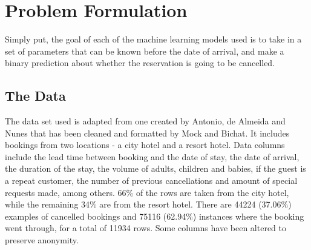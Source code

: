 \documentclass[10pt,conference]{IEEEtran}
\begin{document}
\section{Problem Formulation}
  Simply put, the goal of each of the machine learning models used is to take in a set of parameters that can be known before the date of arrival, and make a binary prediction about whether the reservation is going to be cancelled.
  \subsection{The Data}
    The data set used is adapted from one created by Antonio, de Almeida and Nunes\cite{Antonio2019} that has been cleaned and formatted by Mock and Bichat\cite{mock_bichat}. It includes bookings from two locations - a city hotel and a resort hotel. Data columns include the lead time between booking and the date of stay, the date of arrival, the duration of the stay, the volume of adults, children and babies, if the guest is a repeat customer, the number of previous cancellations and amount of special requests made, among others. 66\% of the rows are taken from the city hotel, while the remaining 34\% are from the resort hotel. There are 44224 (37.06\%) examples of cancelled bookings and 75116 (62.94\%) instances where the booking went through, for a total of 11934 rows. Some columns have been altered to preserve anonymity\cite{Antonio2019}.
  
  
\end{document}

